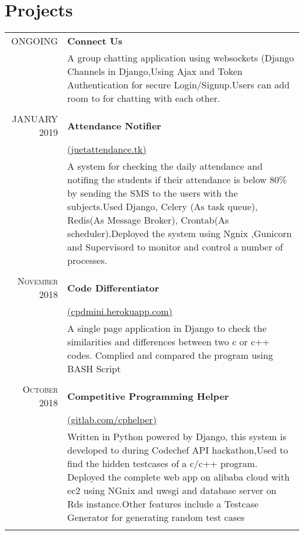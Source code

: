 \documentclass[a4paper,1pt]{article}
\begin{document}
\section{Projects}
\begin{tabular}{r|p{11cm}}
\textsc{ONGOING} & \textbf{Connect Us}\\&\footnotesize{A group chatting application using websockets (Django Channels in Django,Using Ajax and Token Authentication for secure Login/Signup.Users can add room to for chatting with each other.}\\\multicolumn{2}{c}{}\\
 \textsc{JANUARY 2019} & \textbf{Attendance Notifier}\\&\href{http://18.191.156.30:8000/api/v1/}{(juetattendance.tk)}\\&\footnotesize{A system for checking the daily attendance and notifing the students if their attendance
is below 80\% by sending the SMS to the users with the subjects.Used Django, Celery (As task queue), Redis(As Message Broker), Crontab(As scheduler).Deployed the system using Ngnix ,Gunicorn and Supervisord to monitor and control a number of processes.}\\\multicolumn{2}{c}{}\\

\textsc{November 2018} & \textbf{Code Differentiator}\\&\href{http://cpdmini.herokuapp.com/}{(cpdmini.herokuapp.com)}\\&\footnotesize{A single page application in Django to check the similarities and differences between two
c or c++ codes. Complied and compared the program using BASH Script}\\\multicolumn{2}{c}{} \\

\textsc{October 2018} & \textbf{Competitive Programming Helper}\\&\href{https://gitlab.com/gautamaggrawal/cphackathon}{(gitlab.com/cphelper)}\\&\footnotesize{Written in Python powered by Django, this system is developed to during Codechef API
hackathon,Used to find the hidden testcases of a c/c++ program. Deployed the complete web app on alibaba
cloud with ec2 using NGnix and uwsgi and database server on Rds instance.Other
features include a Testcase Generator for generating random test cases }\\\multicolumn{2}{c}{}\\


\end{tabular}\bigskip\par
\end{document}
